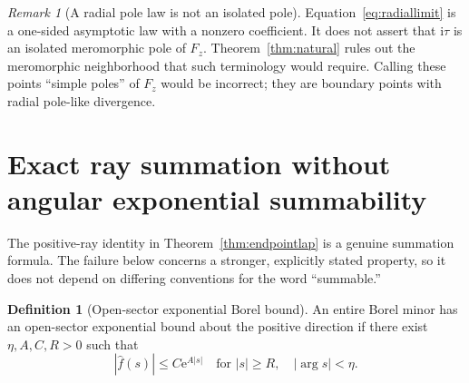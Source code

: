 \documentclass[11pt,a4paper]{article}
\numberwithin{equation}{section}
\theoremstyle{definition}
\newtheorem{definition}[theorem]{Definition}
\theoremstyle{remark}
\newtheorem{remark}[theorem]{Remark}
\newcommand{\ii}{\mathrm i}
\newcommand{\e}{\mathrm e}
\begin{document}
\begin{remark}[A radial pole law is not an isolated pole]
Equation~\eqref{eq:radiallimit} is a one-sided asymptotic law with a nonzero coefficient. It does not assert that $\ii\tau$ is an isolated meromorphic pole of $F_z$. Theorem~\ref{thm:natural} rules out the meromorphic neighborhood that such terminology would require. Calling these points ``simple poles'' of $F_z$ would be incorrect; they are boundary points with radial pole-like divergence.
\end{remark}

\section{Exact ray summation without angular exponential summability}
\label{sec:sector}

The positive-ray identity in Theorem~\ref{thm:endpointlap} is a genuine summation formula. The failure below concerns a stronger, explicitly stated property, so it does not depend on differing conventions for the word ``summable.''

\begin{definition}[Open-sector exponential Borel bound]
An entire Borel minor has an open-sector exponential bound about the positive direction if there exist $\eta,A,C,R>0$ such that
\begin{equation}
 |\widehat f(s)|\le C\e^{A|s|}
 \quad\text{for }|s|\ge R,\quad |\arg s|<\eta.
 \label{eq:sectorbound}
\end{equation}
\end{definition}
\end{document}
